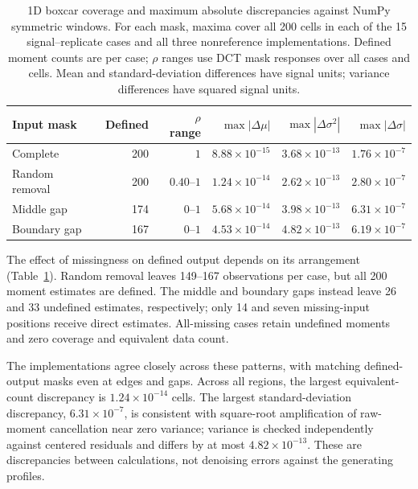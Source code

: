 \documentclass[a4paper,fleqn]{cas-sc}
\begin{document}

\begin{table}[pos=hbp]
	\centering
	\caption{1D boxcar coverage and maximum absolute discrepancies against NumPy symmetric windows. For each mask, maxima cover all 200 cells in each of the 15 signal--replicate cases and all three nonreference implementations. Defined moment counts are per case; $\rho$ ranges use DCT mask responses over all cases and cells. Mean and standard-deviation differences have signal units; variance differences have squared signal units.}
	\label{tab:boxcar_1d_agreement}
	\small
	\begin{tabular}{@{}lrrrrr@{}}
		\toprule
		Input mask & Defined & $\rho$ range & $\max|\Delta\mu|$ & $\max|\Delta\sigma^2|$ & $\max|\Delta\sigma|$ \\
		\midrule
		Complete & 200 & $1$ & $8.88\times10^{-15}$ & $3.68\times10^{-13}$ & $1.76\times10^{-7}$ \\
		Random removal & 200 & $0.40$--$1$ & $1.24\times10^{-14}$ & $2.62\times10^{-13}$ & $2.80\times10^{-7}$ \\
		Middle gap & 174 & $0$--$1$ & $5.68\times10^{-14}$ & $3.98\times10^{-13}$ & $6.31\times10^{-7}$ \\
		Boundary gap & 167 & $0$--$1$ & $4.53\times10^{-14}$ & $4.82\times10^{-13}$ & $6.19\times10^{-7}$ \\
		\bottomrule
	\end{tabular}
\end{table}

The effect of missingness on defined output depends on its arrangement (Table~\ref{tab:boxcar_1d_agreement}). Random removal leaves 149--167 observations per case, but all 200 moment estimates are defined. The middle and boundary gaps instead leave 26 and 33 undefined estimates, respectively; only 14 and seven missing-input positions receive direct estimates. All-missing cases retain undefined moments and zero coverage and equivalent data count.

The implementations agree closely across these patterns, with matching defined-output masks even at edges and gaps. Across all regions, the largest equivalent-count discrepancy is $1.24\times10^{-14}$ cells. The largest standard-deviation discrepancy, $6.31\times10^{-7}$, is consistent with square-root amplification of raw-moment cancellation near zero variance; variance is checked independently against centered residuals and differs by at most $4.82\times10^{-13}$. These are discrepancies between calculations, not denoising errors against the generating profiles.
\end{document}
